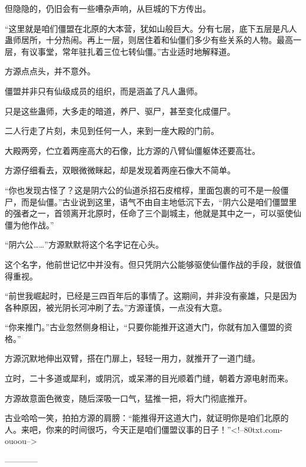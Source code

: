 \begin{this_body}
但隐隐的，仍旧会有一些嘈杂声响，从巨城的下方传出。

“这里就是咱们僵盟在北原的大本营，犹如山般巨大。分有七层，底下五层是凡人蛊师居所，十分热闹。再上一层，则居住着和仙僵们多少有些关系的人物。最高一层，有议事堂，常年驻扎着三位七转仙僵。”古业适时地解释道。

方源点点头，并不意外。

僵盟并非只有仙级成员的组织，而是涵盖了凡人蛊师。

只是这些蛊师，大多走的暗道，养尸、驱尸，甚至变化成僵尸。

二人行走了片刻，未见到任何一人，来到一座大殿的门前。

大殿两旁，伫立着两座高大的石像，比方源的八臂仙僵躯体还要高壮。

方源仔细看去，双眼微微眯起，却是发现着两座石像大不简单。

“你也发现古怪了？这是阴六公的仙道杀招石皮棺椁，里面包裹的可不是一般僵尸，而是仙僵。”古业说到这里，语气不由自主地低沉下去，“阴六公是咱们僵盟里的强者之一，首领离开北原时，任命了三个副城主，他就是其中之一，可以驱使仙僵为他作战。”

“阴六公……”方源默默将这个名字记在心头。

这个名字，他前世记忆中并没有。但只凭阴六公能够驱使仙僵作战的手段，就很值得重视。

“前世我崛起时，已经是三四百年后的事情了。这期间，并非没有豪雄，只是因为各种原因，被光阴长河冲刷了去。”方源谨慎，一点没有大意。

“你来推门。”古业忽然侧身相让，“只要你能推开这道大门，你就有加入僵盟的资格。”

方源沉默地伸出双臂，搭在门扉上，轻轻一用力，就推开了一道门缝。

立时，二十多道或犀利，或阴沉，或呆滞的目光顺着门缝，朝着方源电射而来。

方源故意面色微变，随后深吸一口气，猛推一把，将大门彻底推开。

古业哈哈一笑，拍拍方源的肩膀：“能推得开这道大门，就证明你是咱们北原的人。来吧，你来的时间很巧，今天正是咱们僵盟议事的日子！”<!--80txt.com-ouoou-->

------------

\end{this_body}

